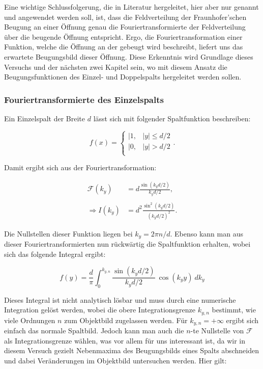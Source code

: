 \documentclass{article}
\begin{document}
Eine wichtige Schlussfolgerung, die in Literatur hergeleitet, hier aber nur genannt und angewendet werden soll, ist, dass die Feldverteilung der Fraunhofer'schen Beugung an einer Öffnung genau die Fouriertransformierte der Feldverteilung über die beugende Öffnung entspricht. Ergo, die Fouriertransformation einer Funktion, welche die Öffnung an der gebeugt wird beschreibt, liefert uns das erwartete Beugungsbild dieser Öffnung. Diese Erkenntnis wird Grundlage dieses Versuchs und der nächsten zwei Kapitel sein, wo mit diesem Ansatz die Beugungsfunktionen des Einzel- und Doppelspalts hergeleitet werden sollen.

\subsubsection{Fouriertransformierte des Einzelspalts}

Ein Einzelspalt der Breite $d$ lässt sich mit folgender Spaltfunktion beschreiben:

\begin{equation}
    f(x) =
    \begin{cases} 
    \vert 1 , & |y| \leq d / 2 \\
    \vert 0 , & |y| > d / 2 \\
    \end{cases}.
\end{equation}

Damit ergibt sich aus der Fouriertransformation:

\begin{equation}
    \begin{split}
        \mathcal{F}(k_y) &= d \frac{\sin{(k_y d/2)}}{k_y d/2}, \\ \\
        \Rightarrow I(k_y) &= d^2 \frac{\sin^2{(k_y d/2)}}{(k_y d/2)^2}.
    \end{split}
\end{equation}

Die Nullstellen dieser Funktion liegen bei $k_y = {2 \pi n}/{d}$. Ebenso kann man aus dieser Fouriertransformierten nun rückwärtig die Spaltfunktion erhalten, wobei sich das folgende Integral ergibt:

\begin{equation}
    f (y) = \frac{d}{\pi} \int_0^{k_{y,n}} \frac{\sin{(k_y d / 2)}}{k_y d / 2} \ \cos{(k_y y)} \ dk_y
\end{equation}

Dieses Integral ist nicht analytisch lösbar und muss durch eine numerische Integration gelöst werden, wobei die obere Integrationsgrenze $k_{y,n}$ bestimmt, wie viele Ordnungen $n$ zum Objektbild zugelassen werden. Für $k_{y,n} = + \infty$ ergibt sich einfach das normale Spaltbild. Jedoch kann man auch die $n$-te Nullstelle von $\mathcal{F}$ als Integrationsgrenze wählen, was vor allem für uns interessant ist, da wir in diesem Versuch gezielt Nebenmaxima des Beugungsbilds eines Spalts abschneiden und dabei Veränderungen im Objektbild untersuchen werden. Hier gilt:
\end{document}
